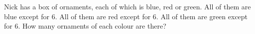 Nick has a box of ornaments, each of which is blue, red or green. All of them are blue except for $6$. All of them are red except for $6$. All of them are green except for $6$. How many ornaments of each colour are there?
